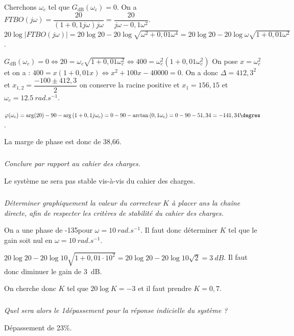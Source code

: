 \documentclass[10pt,fleqn]{article} %
\begin{document}
\begin{multicols}{2}
\begin{corrige}
Cherchons $\omega_c$ tel que $G_{\text{dB}}(\omega_c)=0$. 
On a $FTBO(j\omega )
=\dfrac{20}{(1+0,1j\omega)j\omega}
=\dfrac{20}{j\omega-0,1\omega^2}$. 
$20\log |FTBO(j\omega )| 
= 20\log 20 - 20\log \sqrt{\omega^2+0,01\omega^4}
= 20\log 20 - 20\log \omega\sqrt{1+0,01\omega^2}$.

 $G_{\text{dB}}(\omega_c)=0 
\Leftrightarrow   20 =\omega_c\sqrt{1+0,01\omega_c^2} 
\Leftrightarrow   400 =\omega_c^2 \left(1+0,01\omega_c^2\right)$
On pose $x=\omega_c^2$ et on a :
$400 =x \left(1+0,01x\right)\Leftrightarrow x^2+100x-40000=0$. 
On a donc $\Delta = 412,3^2$ et $x_{1,2}=\dfrac{-100\pm412,3}{2}$ on conserve la racine positive et  $x_1=156,15$ et $\omega_c=\SI{12,5}{rad.s^{-1}}$.

$\varphi(\omega_c)=\arg(20)-90 -\arg\left(1+0,1j\omega_c \right)
=0- 90 -\arctan\left( 0,1\omega_c \right)
=0-90-51,34=-141,34\degres$.

La marge de phase est donc de 38,66\degres.
\end{corrige}
\else
\fi

\subparagraph{}\textit{Conclure par rapport au cahier des charges.}
\ifprof
\begin{corrige}
Le système ne sera pas stable vis-à-vis du cahier des charges.
\end{corrige}
\else
\fi

\subparagraph{}\textit{Déterminer graphiquement la valeur du correcteur $K$ à placer ans la chaîne directe, afin de respecter les critères de stabilité du cahier des charges.}
\ifprof
\begin{corrige}
On a une phase de -135\degres pour $\omega=\SI{10}{rad.s^{-1}}$. Il faut donc déterminer $K$ tel que le gain soit nul en $\omega=\SI{10}{rad.s^{-1}}$.

$20\log 20 - 20\log 10\sqrt{1+0,01\cdot 10^2}=20\log 20 - 20\log 10\sqrt{2}=\SI{3}{dB}$. Il faut donc diminuer le gain de \SI{3}{dB}.

On cherche donc $K$ tel que $20 \log K = -3$ et il faut prendre $K=0,7$.
\end{corrige}
\else
\fi

\subparagraph{}\textit{Quel sera alors le 1\ier dépassement pour la réponse indicielle du système ?}
\ifprof
\begin{corrige}
Dépassement de 23\%.
\end{corrige}
\else
\fi

\ifprof
\else
\end{multicols}
\fi
%
%
%
\end{document}
